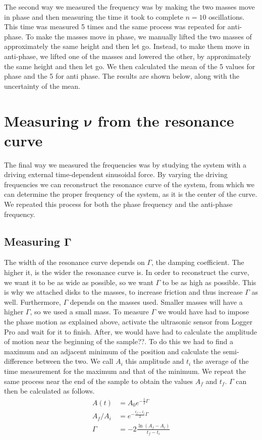 \documentclass{article}
\begin{document}
The second way we measured the frequency was by making the two masses move in phase and then measuring the time it took to complete $n=10$ oscillations. This time was measured 5 times and the same process was repeated for anti-phase. To make the masses move in phase, we manually lifted the two masses of approximately the same height and then let go. Instead, to make them move in anti-phase, we lifted one of the masses and lowered the other, by approximately the same height and then let go.
We then calculated the mean of the 5 values for phase and the 5 for anti phase. The results are shown below, along with the uncertainty of the mean. 



\section{Measuring $ \bm \nu $ from the resonance curve}
The final way we measured the frequencies was by studying the system with a driving external time-dependent sinusoidal force. By varying the driving frequencies we can reconstruct the resonance curve of the system, from which we can determine the proper frequency of the system, as it is the center of the curve. We repeated this process for both the phase frequency and the anti-phase frequency.
\subsection{Measuring $\bm \Gamma$}
The width of the resonance curve depends on $\Gamma$, the damping coefficient. The higher it, is the wider the resonance curve is. In order to reconstruct the curve, we want it to be as wide as possible, so we want $\Gamma$ to be as high as possible. This is why we attached disks to the masses, to increase friction and thus increase $\Gamma$ as well. Furthermore, $\Gamma$ depends on the masses used. Smaller masses will have a higher $\Gamma$, so we used a small mass. %
To measure $\Gamma$ we would have had to impose the phase motion as explained above, activate the ultrasonic sensor from Logger Pro and wait for it to finish. After, we would have had to calculate the amplitude of motion near the beginning of the sample??. To do this we had to find a maximum and an adjacent minimum of the position and calculate the semi-difference between the two. We call $A_i$ this amplitude and $t_i$ the average of the time measurement for the maximum and that of the minimum. We repeat the same process near the end of the sample to obtain the values $A_f$ and $t_f$. $\Gamma$ can then be calculated as follows.
\begin{align}
    A(t) &= A_0 e^{-\frac{t}{2} \Gamma} \\
    A_f / A_i &= e^{-\frac{t_f-t_i}{2} \Gamma} \\
    \Gamma &= -2 \frac{ \ln(A_f - A_i) }{ t_f-t_i }
\end{align}
\end{document}
